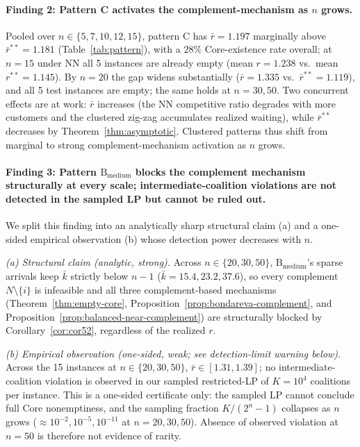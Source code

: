 \documentclass[11pt]{article}
\theoremstyle{plain}
\theoremstyle{definition}
\theoremstyle{remark}
\begin{document}
\paragraph{Finding 2: Pattern C activates the complement-mechanism as $n$ grows.} Pooled over $n\in\{5,7,10,12,15\}$, pattern C has $\bar r = 1.197$ marginally above $\bar r^{\ast\ast}=1.181$ (Table~\ref{tab:pattern}), with a $28\%$ Core-existence rate overall; at $n=15$ under NN all 5 instances are already empty (mean $r=1.238$ vs.\ mean $r^{\ast\ast}=1.145$). By $n=20$ the gap widens substantially ($\bar r = 1.335$ vs.\ $\bar r^{\ast\ast} = 1.119$), and all 5 test instances are empty; the same holds at $n=30, 50$. Two concurrent effects are at work: $\bar r$ increases (the NN competitive ratio degrades with more customers and the clustered zig-zag accumulates realized waiting), while $\bar r^{\ast\ast}$ decreases by Theorem~\ref{thm:asymptotic}. Clustered patterns thus shift from marginal to strong complement-mechanism activation as $n$ grows.

\paragraph{Finding 3: Pattern $\text{B}_{\text{medium}}$ blocks the complement mechanism structurally at every scale; intermediate-coalition violations are not detected in the sampled LP but cannot be ruled out.} We split this finding into an analytically sharp structural claim (a) and a one-sided empirical observation (b) whose detection power decreases with $n$.

\emph{(a) Structural claim (analytic, strong).} Across $n\in\{20,30,50\}$, $\text{B}_{\text{medium}}$'s sparse arrivals keep $\bar k$ strictly below $n-1$ ($\bar k = 15.4, 23.2, 37.6$), so every complement $N\setminus\{i\}$ is infeasible and all three complement-based mechanisms (Theorem~\ref{thm:empty-core}, Proposition~\ref{prop:bondareva-complement}, and Proposition~\ref{prop:balanced-near-complement}) are structurally blocked by Corollary~\ref{cor:cor52}, regardless of the realized $r$.

\emph{(b) Empirical observation (one-sided, weak; see detection-limit warning below).} Across the 15 instances at $n\in\{20,30,50\}$, $\bar r \in [1.31,1.39]$; no intermediate-coalition violation is observed in our sampled restricted-LP of $K=10^{4}$ coalitions per instance. This is a one-sided certificate only: the sampled LP cannot conclude full Core nonemptiness, and the sampling fraction $K/(2^{n}-1)$ collapses as $n$ grows ($\approx 10^{-2}, 10^{-5}, 10^{-11}$ at $n=20,30,50$). Absence of observed violation at $n=50$ is therefore not evidence of rarity.
\end{document}
